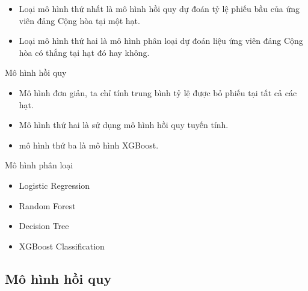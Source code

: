 \documentclass[10pt]{beamer}
\theoremstyle{remark}
\theoremstyle{definition}
\begin{document}
\begin{frame}
	\begin{itemize}
		\item Loại mô hình thứ nhất là mô hình hồi quy dự đoán tỷ lệ phiếu bầu của ứng viên đảng Cộng hòa tại một hạt.
		\item Loại mô hình thứ hai là mô hình phân loại dự đoán liệu ứng viên đảng Cộng hòa có thắng tại hạt đó hay không.
	\end{itemize}
\end{frame}

\begin{frame}{Mô hình hồi quy}

    \begin{itemize}
        \item Mô hình đơn giản, ta chỉ tính trung bình tỷ lệ được bỏ phiếu tại tất cả các hạt.
        \item Mô hình thứ hai là sử dụng mô hình hồi quy tuyến tính.
        \item mô hình thứ ba là mô hình XGBoost.
    \end{itemize}
\end{frame}

\begin{frame}{Mô hình phân loại}
	\begin{itemize}
        \item Logistic Regression
        \item Random Forest
        \item Decision Tree
        \item XGBoost Classification
    \end{itemize}
\end{frame}

\subsection{Mô hình hồi quy}
\end{document}
